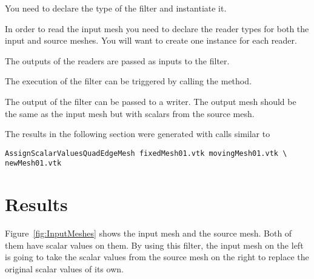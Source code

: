 \documentclass{InsightArticle}
\begin{document}
\begin{center}

\end{center}

You need to declare the type of the filter and instantiate it.

\begin{center}

\end{center}

In order to read the input mesh you need to declare the reader types for both the input
and source meshes. You will want to create one instance for each reader.

\begin{center}

\end{center}

The outputs of the readers are passed as inputs to the filter.

\begin{center}

\end{center}

The execution of the filter can be triggered by calling the  method.

\begin{center}

\end{center}

The output of the filter can be passed to a writer. The output mesh should be the same as the input mesh 
but with scalars from the source mesh.

\begin{center}

\end{center}

The results in the following section were generated with calls similar to

\begin{verbatim}
AssignScalarValuesQuadEdgeMesh fixedMesh01.vtk movingMesh01.vtk \
newMesh01.vtk 
\end{verbatim}

\section{Results}
Figure~\ref{fig:InputMeshes} shows the input mesh and the source mesh.
Both of them have scalar values on them. By using this filter, the input mesh on the left
is going to take the scalar values from the source mesh on the right to replace the
original scalar values of its own.
\end{document}
